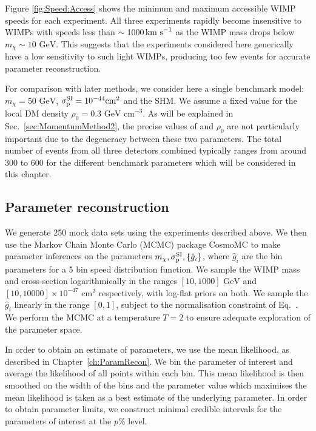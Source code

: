 Figure \ref{fig:Speed:Access} shows the minimum and maximum accessible WIMP speeds for each experiment. All three experiments rapidly become insensitive to WIMPs with speeds less than \(\sim 1000 \,\textrm{km s}^{-1}\) as the WIMP mass drops below \(m_\chi \sim 10 \textrm{ GeV}\). This suggests that the experiments considered here generically have a low sensitivity to such light WIMPs, producing too few events for accurate parameter reconstruction. 

For comparison with later methods, we consider here a single benchmark model: \(m_\chi = 50 \textrm{ GeV}\), $\sigmapsi = 10^{-44} \mathrm{cm}^2$ and the SHM. We assume a fixed value for the local DM density $\rho_0 = 0.3 \textrm{ GeV cm}^{-3}$. As will be explained in Sec.\ \ref{sec:MomentumMethod2}, the precise values of \sigmapsi and \(\rho_0\) are not particularly important due to the degeneracy between these two parameters. The total number of events from all three detectors combined typically ranges from around 300 to 600 for the different benchmark parameters which will be considered in this chapter.

\subsection{Parameter reconstruction}
We generate 250 mock data sets using the experiments described above. We then use the Markov Chain Monte Carlo (MCMC) package CosmoMC \cite{} to make parameter inferences on the parameters $\mchi, \sigmapsi, \left\{\hat{g}_i\right\}$, where $\hat{g}_i$ are the bin parameters for a 5 bin speed distribution function. We sample the WIMP mass and cross-section logarithmically in the ranges \([10, 1000] \textrm{ GeV}\) and \([10, 10000] \times 10^{-47} \textrm{ cm}^2\) respectively, with log-flat priors on both. We sample the $\hat{g}_i$ linearly in the range $[0,1]$, subject to the normalisation constraint of Eq.~\cite{eq:Speed:ghat}. We perform the MCMC at a temperature $T=2$ to ensure adequate exploration of the parameter space.

In order to obtain an estimate of parameters, we use the mean likelihood, as described in Chapter~\ref{ch:ParamRecon}. We bin the parameter of interest and average the likelihood of all points within each bin. This mean likelihood is then smoothed on the width of the bins and the parameter value which maximises the mean likelihood is taken as a best estimate of the underlying parameter. In order to obtain parameter limits, we construct minimal credible intervals for the parameters of interest at the $p\%$ level. 

